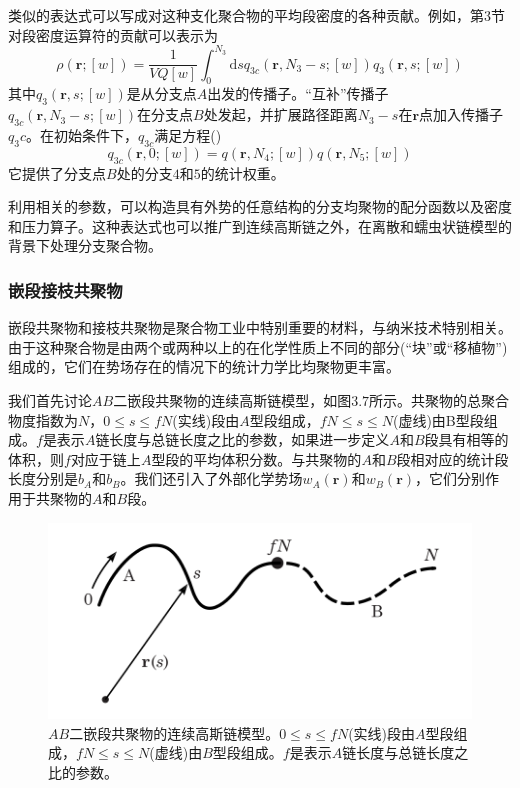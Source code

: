 类似的表达式可以写成对这种支化聚合物的平均段密度的各种贡献。例如，第$3$节对段密度运算符的贡献可以表示为
\begin{equation}
\rho(\mathbf{r};[w])=\frac{1}{VQ[w]}\int _{0}^{N_3} \mathrm{d}sq_{3c}(\mathbf{r},N_3-s;[w])q_3(\mathbf{r},s;[w])
\end{equation}
其中$q_3(\mathbf{r},s;[w])$是从分支点$A$出发的传播子。“互补”传播子$q_{3c}(\mathbf{r},N_3-s;[w])$在分支点$B$处发起，并扩展路径距离$N_3-s$在$\mathbf{r}$点加入传播子$q_3c$。在初始条件下，$q_{3c}$满足方程(\label{传播子求导})
\begin{equation}
q_{3c}(\mathbf{r},0;[w])=q(\mathbf{r},N_4;[w])q(\mathbf{r},N_5;[w])
\end{equation}
它提供了分支点$B$处的分支$4$和$5$的统计权重。

利用相关的参数，可以构造具有外势的任意结构的分支均聚物的配分函数以及密度和压力算子。这种表达式也可以推广到连续高斯链之外，在离散和蠕虫状链模型的背景下处理分支聚合物。

\subsubsection{嵌段接枝共聚物}
嵌段共聚物和接枝共聚物是聚合物工业中特别重要的材料，与纳米技术特别相关。由于这种聚合物是由两个或两种以上的在化学性质上不同的部分(“块”或“移植物”)组成的，它们在势场存在的情况下的统计力学比均聚物更丰富。

我们首先讨论$AB$二嵌段共聚物的连续高斯链模型，如图$3.7$所示。共聚物的总聚合物度指数为$N$，$0\leq s \leq fN$(实线)段由$A$型段组成，$fN \leq s \leq N$(虚线)由B型段组成。$f$是表示$A$链长度与总链长度之比的参数，如果进一步定义$A$和$B$段具有相等的体积，则$f$对应于链上$A$型段的平均体积分数。与共聚物的$A$和$B$段相对应的统计段长度分别是$b_A$和$b_B$。我们还引入了外部化学势场$w_A(\mathbf{r})$和$w_B(\mathbf{r})$，它们分别作用于共聚物的$A$和$B$段。

\begin{figure}[H]
\centering
\includegraphics[scale=0.7]{./figures/37.png}
\caption{$AB$二嵌段共聚物的连续高斯链模型。$0\leq s \leq fN$(实线)段由$A$型段组成，$fN \leq s \leq N$(虚线)由$B$型段组成。$f$是表示$A$链长度与总链长度之比的参数。}
\end{figure}

